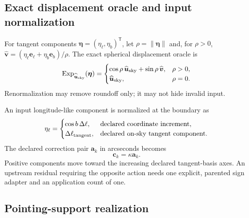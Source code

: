 \subsection{Exact displacement oracle and input normalization}

For tangent components
$\boldsymbol\eta=(\eta_\ell,\eta_b)^\mathsf T$, let
$\rho=\lVert\boldsymbol\eta\rVert$ and, for $\rho>0$,
$\widehat{\boldsymbol v}=(\eta_\ell\boldsymbol e_\ell+
\eta_b\boldsymbol e_b)/\rho$.  The exact spherical displacement oracle is
\begin{equation}
 \operatorname{Exp}_{\widehat{\boldsymbol u}_{\rm sky}}(\boldsymbol\eta)=
 \begin{cases}
  \cos\rho\,\widehat{\boldsymbol u}_{\rm sky}
   +\sin\rho\,\widehat{\boldsymbol v},&\rho>0,\\
  \widehat{\boldsymbol u}_{\rm sky},&\rho=0.
 \end{cases}
 \label{eq:exp}
\end{equation}
Renormalization may remove roundoff only; it may not hide invalid input.

An input longitude-like component is normalized at the boundary as
\begin{equation}
 \eta_\ell=
 \begin{cases}
  \cos b\,\Delta\ell,&\text{declared coordinate increment},\\
  \Delta\ell_{\rm tangent},&\text{declared on-sky tangent component}.
 \end{cases}
 \label{eq:longitude-normalization}
\end{equation}
The declared correction pair $\boldsymbol a_k$ in arcseconds becomes
\begin{equation}
 \boldsymbol c_k=\kappa\boldsymbol a_k.
 \label{eq:correction-unit}
\end{equation}
Positive components move toward the increasing declared tangent-basis axes.
An upstream residual requiring the opposite action needs one explicit,
parented sign adapter and an application count of one.

\subsection{Pointing-support realization}

